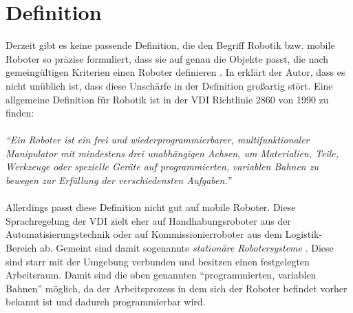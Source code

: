 \section{Definition}\label{s:definition}
Derzeit gibt es keine passende Definition, die den Begriff Robotik bzw. mobile Roboter so präzise formuliert, dass sie auf genau die Objekte passt, die nach gemeingültigen Kriterien einen Roboter definieren \cite{hertzberg2009mobile}. In \cite{hertzberg2009mobile} erklärt der Autor, dass es nicht unüblich ist, dass diese Unschärfe in der Definition großartig stört. Eine allgemeine Definition für Robotik ist in der \ac{VDI} Richtlinie 2860 von 1990 zu finden:
\\
\\
\textit{"`Ein Roboter ist ein frei und wiederprogrammierbarer, multifunktionaler Manipulator mit mindestens drei unabhängigen Achsen, um Materialien, Teile, Werkzeuge oder spezielle Geräte auf programmierten,
variablen Bahnen zu bewegen zur Erfüllung der verschiedensten Aufgaben."'}
\\
\\
Allerdings passt diese Definition nicht gut auf mobile Roboter. Diese Sprachregelung der \ac{VDI} zielt eher auf Handhabungsroboter aus der Automatisierungstechnik oder auf Kommissionierroboter aus dem Logistik-Bereich ab. Gemeint sind damit sogenannte \textit{stationäre Robotersysteme} \cite{Haun2007}. Diese sind starr mit der Umgebung verbunden und besitzen einen festgelegten Arbeitsraum. Damit sind die oben genannten "`programmierten, variablen Bahnen"' möglich, da der Arbeitsprozess in dem sich der Roboter befindet vorher bekannt ist und dadurch programmierbar wird. 

